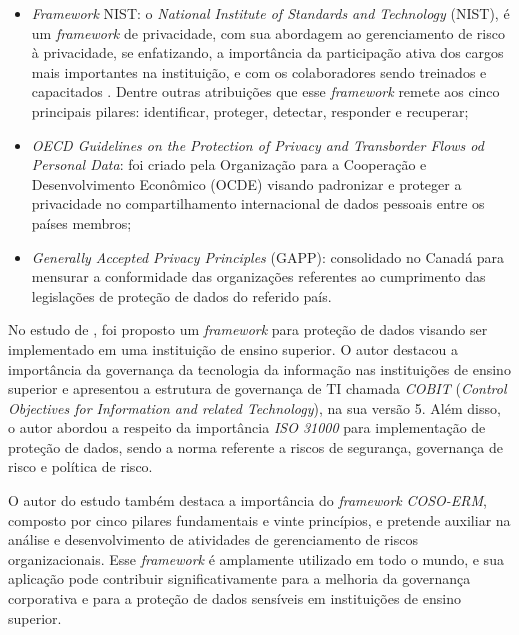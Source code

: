 \documentclass[
	12pt,				%
	openright,			%
	oneside,			%
	a4paper,			%
	english,			%
	french,				%
	spanish,			%
	brazil,				%
	]{abntex2}
\begin{document}
\begin{itemize}
\item \textit{Framework} NIST: o \textit{National Institute of Standards and Technology}  (NIST), é um \textit{framework} de privacidade, com sua abordagem ao gerenciamento de risco à privacidade, se enfatizando, a importância da participação ativa dos cargos mais importantes na instituição, e com os colaboradores sendo treinados e capacitados \cite{Blum2020}. Dentre outras atribuições que esse \textit{framework} remete aos cinco principais pilares: identificar, proteger, detectar, responder e recuperar; 
\item \textit{OECD Guidelines on the Protection of Privacy and Transborder Flows od Personal Data}: foi criado pela Organização para a Cooperação e Desenvolvimento Econômico (OCDE) visando padronizar e proteger a privacidade no compartilhamento internacional de dados pessoais entre os países membros;
\item \textit{Generally Accepted Privacy Principles} (GAPP): consolidado no Canadá para mensurar a conformidade das organizações referentes ao cumprimento das legislações de proteção de dados do referido país. 

\end{itemize}


No estudo de , foi proposto um \textit{framework} para proteção de dados visando ser implementado em uma instituição de ensino superior. O autor destacou a importância da governança da tecnologia da informação nas instituições de ensino superior e apresentou a estrutura de governança de TI chamada \textit{COBIT} (\textit{Control Objectives for Information and related Technology}), na sua versão 5. Além disso, o autor abordou a respeito da importância \textit{ISO 31000} para implementação de proteção de dados, sendo a norma referente a riscos de segurança, governança de risco e política de risco.

O autor do estudo também destaca a importância do \textit{framework} \textit{COSO-ERM}, composto por cinco pilares fundamentais e vinte princípios, e pretende auxiliar na análise e desenvolvimento de atividades de gerenciamento de riscos organizacionais. Esse \textit{framework} é amplamente utilizado em todo o mundo, e sua aplicação pode contribuir significativamente para a melhoria da governança corporativa e para a proteção de dados sensíveis em instituições de ensino superior. 
\end{document}
